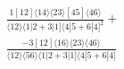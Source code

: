 \documentclass[varwidth, border=5pt]{standalone}
\begin{document}
\begin{my}
$\begin{gathered}
\scriptscriptstyle\frac{1[12]⟨14⟩⟨23⟩[45]⟨46⟩}{⟨12⟩⟨1|2+3|1]⟨4|5+6|4]^2}+\\
\scriptscriptstyle\frac{-3[12]⟨16⟩⟨23⟩⟨46⟩}{⟨12⟩⟨56⟩⟨1|2+3|1]⟨4|5+6|4]}\phantom{+}
\end{gathered}$
\end{my}
\end{document}
